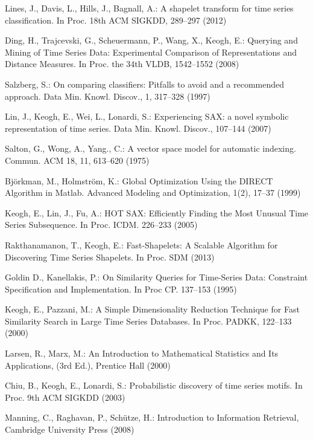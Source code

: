 \documentclass[conference]{IEEEtran}
\begin{document}
\begin{thebibliography}{5}
Lines, J., Davis, L., Hills, J., Bagnall, A.:
A shapelet transform for time series classification. 
In Proc. 18th ACM SIGKDD, 289--297 (2012)

Ding, H., Trajcevski, G., Scheuermann, P., Wang, X., Keogh, E.:
Querying and Mining of Time Series Data: Experimental Comparison of Representations and Distance
Measures. 
In Proc. the 34th VLDB, 1542--1552 (2008)

Salzberg, S.:
On comparing classifiers: Pitfalls to avoid and a recommended approach. 
Data Min. Knowl. Discov., 1, 317--328 (1997)

Lin, J., Keogh, E., Wei, L., Lonardi, S.:
Experiencing SAX: a novel symbolic representation of time series.
Data Min. Knowl. Discov., 107--144 (2007)

Salton, G., Wong, A., Yang., C.:
A vector space model for automatic indexing. 
Commun. ACM 18, 11, 613--620 (1975)

Bj\"{o}rkman, M., Holmstr\"{o}m, K.:
Global Optimization Using the DIRECT Algorithm in Matlab.
Advanced Modeling and Optimization, 1(2), 17--37 (1999)

Keogh, E., Lin, J., Fu, A.:
HOT SAX: Efficiently Finding the Most Unusual Time Series Subsequence. 
In Proc. ICDM. 226--233 (2005)

Rakthanamanon, T., Keogh, E.:
Fast-Shapelets: A Scalable Algorithm for Discovering Time Series Shapelets.
In Proc. SDM (2013)

Goldin D., Kanellakis, P.:
On Similarity Queries for Time-Series Data: Constraint Specification and Implementation. 
In Proc CP. 137--153 (1995)

Keogh, E., Pazzani, M.:
A Simple Dimensionality Reduction Technique for Fast Similarity Search in Large Time Series
Databases. In Proc. PADKK, 122--133 (2000)

Larsen, R., Marx, M.:
An Introduction to Mathematical Statistics and Its Applications, (3rd Ed.),
Prentice Hall (2000)

Chiu, B., Keogh, E., Lonardi, S.:
Probabilistic discovery of time series motifs. 
In Proc. 9th ACM SIGKDD (2003)

Manning, C., Raghavan, P., Sch\"utze, H.: 
Introduction to Information Retrieval, Cambridge University Press (2008)


\end{thebibliography}
\end{document}

